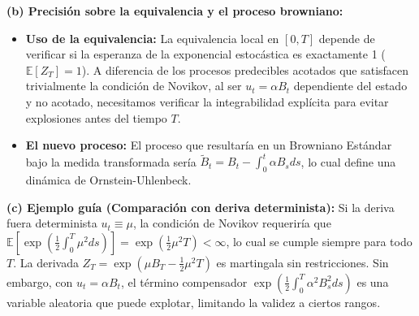 \documentclass[11pt, letterpaper]{article}
\begin{document}
\begin{solucion}
    \textbf{(b) Precisión sobre la equivalencia y el proceso browniano:}
    \begin{itemize}
        \item[(i)] \textbf{Uso de la equivalencia:} La equivalencia local en $[0, T]$ depende de verificar si la esperanza de la exponencial estocástica es exactamente 1 ($\mathbb{E}[Z_T] = 1$). A diferencia de los procesos predecibles acotados que satisfacen trivialmente la condición de Novikov, al ser $u_t = \alpha B_t$ dependiente del estado y no acotado, necesitamos verificar la integrabilidad explícita para evitar explosiones antes del tiempo $T$.
        \item[(ii)] \textbf{El nuevo proceso:} El proceso que resultaría en un Browniano Estándar bajo la medida transformada sería $\tilde{B}_t = B_t - \int_0^t \alpha B_s ds$, lo cual define una dinámica de Ornstein-Uhlenbeck.
    \end{itemize}

    \vspace{3mm}
    \textbf{(c) Ejemplo guía (Comparación con deriva determinista):}
    Si la deriva fuera determinista $u_t \equiv \mu$, la condición de Novikov requeriría que $\mathbb{E}\left[\exp\left(\frac{1}{2}\int_0^T \mu^2 ds\right)\right] = \exp\left(\frac{1}{2}\mu^2 T\right) < \infty$, lo cual se cumple siempre para todo $T$. La derivada $Z_T = \exp(\mu B_T - \frac{1}{2}\mu^2 T)$ es martingala sin restricciones. Sin embargo, con $u_t = \alpha B_t$, el término compensador $\exp\left(\frac{1}{2}\int_0^T \alpha^2 B_s^2 ds\right)$ es una variable aleatoria que puede explotar, limitando la validez a ciertos rangos.


\end{solucion}
\end{document}

